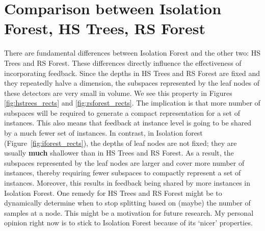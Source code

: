 \documentclass{article} %
\begin{document}
\section{Comparison between Isolation Forest, HS Trees, RS Forest}
There are fundamental differences between Isolation Forest and the other two: HS Trees and RS Forest. These differences directly influence the effectiveness of incorporating feedback. Since the depths in HS Trees and RS Forest are fixed and they repeatedly halve a dimension, the subspaces represented by the leaf nodes of these detectors are very small in volume. We see this property in Figures \ref{fig:hstrees_rects} and \ref{fig:rsforest_rects}. The implication is that more number of subspaces will be required to generate a compact representation for a set of instances. This also means that feedback at instance level is going to be shared by a much fewer set of instances. In contrast, in Isolation forest (Figure~\ref{fig:iforest_rects}), the depths of leaf nodes are not fixed; they are usually \textbf{much} shallower than in HS Trees and  RS Forest. As a result, the subspaces represented by the leaf nodes are larger and cover more number of instances, thereby requiring fewer subspaces to compactly represent a set of instances. Moreover, this results in feedback being shared by more instances in Isolation Forest. One remedy for HS Trees and RS Forest might be to dynamically determine when to stop splitting based on (maybe) the number of samples at a node. This might be a motivation for future research. My personal opinion right now is to stick to Isolation Forest because of its `nicer' properties.
\end{document}
